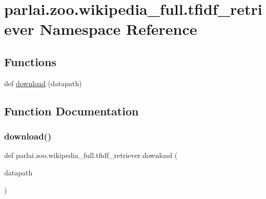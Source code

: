 \hypertarget{namespaceparlai_1_1zoo_1_1wikipedia__full_1_1tfidf__retriever}{}\section{parlai.\+zoo.\+wikipedia\+\_\+full.\+tfidf\+\_\+retriever Namespace Reference}
\label{namespaceparlai_1_1zoo_1_1wikipedia__full_1_1tfidf__retriever}
\subsection*{Functions}
\begin{DoxyCompactItemize}
\item 
def \hyperlink{namespaceparlai_1_1zoo_1_1wikipedia__full_1_1tfidf__retriever_ae4ca3b13b024e2db9313c275cfcdfac7}{download} (datapath)
\end{DoxyCompactItemize}


\subsection{Function Documentation}
\mbox{\label{namespaceparlai_1_1zoo_1_1wikipedia__full_1_1tfidf__retriever_ae4ca3b13b024e2db9313c275cfcdfac7}} 
\subsubsection{\texorpdfstring{download()}{download()}}
{\footnotesize\ttfamily def parlai.\+zoo.\+wikipedia\+\_\+full.\+tfidf\+\_\+retriever.\+download (\begin{DoxyParamCaption}\item[{}]{datapath }\end{DoxyParamCaption})}

